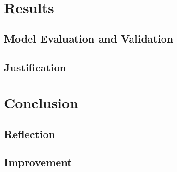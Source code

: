 \chapter*{Results}


\section*{Model Evaluation and Validation}


\section*{Justification}



\chapter*{Conclusion}



\section*{Reflection}


\section*{Improvement}
